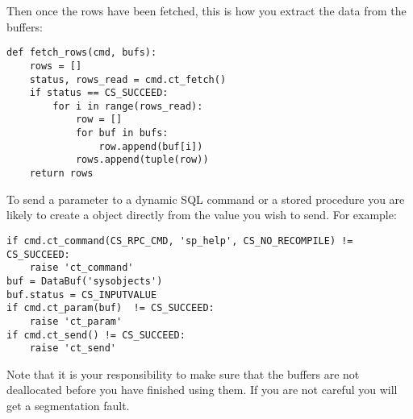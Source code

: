 Then once the rows have been fetched, this is how you extract the data
from the buffers:

\begin{verbatim}
def fetch_rows(cmd, bufs):
    rows = []
    status, rows_read = cmd.ct_fetch()
    if status == CS_SUCCEED:
        for i in range(rows_read):
            row = []
            for buf in bufs:
                row.append(buf[i])
            rows.append(tuple(row))
    return rows
\end{verbatim}

To send a parameter to a dynamic SQL command or a stored procedure you
are likely to create a  object directly from the value
you wish to send.  For example:

\begin{verbatim}
if cmd.ct_command(CS_RPC_CMD, 'sp_help', CS_NO_RECOMPILE) != CS_SUCCEED:
    raise 'ct_command'
buf = DataBuf('sysobjects')
buf.status = CS_INPUTVALUE
if cmd.ct_param(buf)  != CS_SUCCEED:
    raise 'ct_param'
if cmd.ct_send() != CS_SUCCEED:
    raise 'ct_send'
\end{verbatim}

Note that it is your responsibility to make sure that the buffers are
not deallocated before you have finished using them.  If you are not
careful you will get a segmentation fault.
